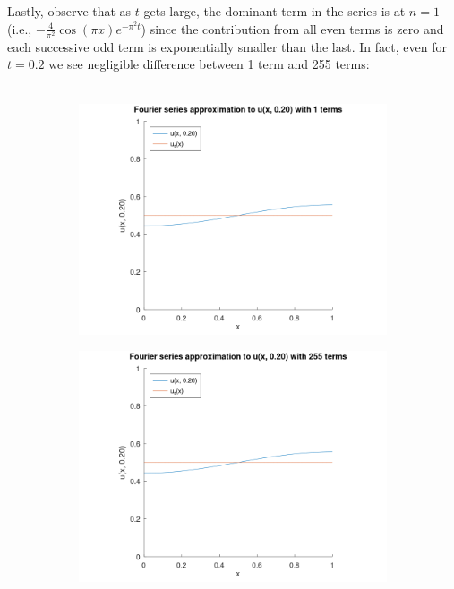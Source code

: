 \begin{solution}
    \pagebreak

    Lastly, observe that as $t$ gets large, the dominant term in the series is at $n=1$ (i.e., 
    $-\frac{4}{\pi^2} \cos{(\pi x) e^{-\pi^2 t}}$) since the contribution from all even terms is zero and each 
    successive odd term is exponentially smaller than the last. In fact, even for $t = 0.2$ we see negligible 
    difference between 1 term and 255 terms:
    \ \\\\

    \begin{figure}[h]
        \centering
        \begin{subfigure}[b]{0.475\textwidth}
            \centering
            \includegraphics[width=\textwidth]{problem1_fourier_series_solution_1_terms_t_0.20.png}
            \label{fig:problem1_time_dependent_1term}
        \end{subfigure}
        \hfill
        \begin{subfigure}[b]{0.475\textwidth}
            \centering
            \includegraphics[width=\textwidth]{problem1_fourier_series_solution_255_terms_t_0.20.png}

\end{subfigure}
\end{figure}
\end{solution}
